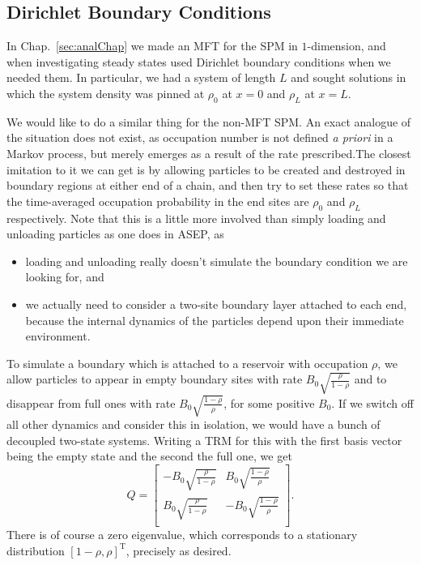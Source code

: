 \subsection{Dirichlet Boundary Conditions}
In Chap.~\ref{sec:analChap} we made an MFT for the SPM in $1$-dimension, and when 
investigating steady states used Dirichlet boundary conditions when we needed them.
In particular, we had a system of length $L$ and sought solutions in which the system
density was pinned at $\rho_0$ at $x=0$ and $\rho_L$ at $x=L$. 

We would like to do a similar thing for the non-MFT SPM. An exact analogue of the situation
does not exist, as occupation number is not defined \textit{a priori} in a Markov process, but merely emerges as a result of the rate prescribed.The closest imitation to it
we can get is by allowing particles to be created and destroyed in boundary regions at
either end of a chain, and then try to set these rates so that the time-averaged occupation probability in the end sites are $\rho_0$ and $\rho_L$ respectively. Note
that this is a little more involved than simply loading and unloading particles as
one does in ASEP, as
\begin{itemize}
 \item loading and unloading really doesn't simulate the boundary condition we are looking for, and
 \item we actually need to consider a two-site boundary layer attached to each end, because the internal dynamics of the particles depend upon their immediate environment.
\end{itemize}
To simulate a boundary which is attached to a reservoir with occupation $\rho$, we allow
particles to appear in empty boundary sites with rate $B_0 \sqrt{\frac{\rho}{1-\rho}}$
and to disappear from full ones with rate $B_0 \sqrt{\frac{1-\rho}{\rho}}$,
for some positive $B_0$. If we switch
off all other dynamics and consider this in isolation, we would have a bunch of
decoupled two-state systems. Writing a TRM for this with the first basis vector being
the empty state and the second the full one, we get
\begin{equation}
 Q = 
 \begin{bmatrix}
  - B_0 \sqrt{\frac{\rho}{1-\rho}} & B_0 \sqrt{\frac{1-\rho}{\rho}} \\
  B_0 \sqrt{\frac{\rho}{1-\rho}} & -B_0 \sqrt{\frac{1-\rho}{\rho}} \\
 \end{bmatrix}.
\end{equation}
There is of course a zero eigenvalue, which corresponds to a stationary distribution
$ [1-\rho, \rho]^\mathrm{T} $, precisely as desired.

